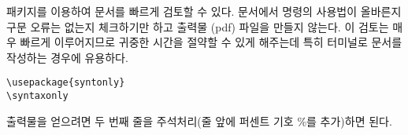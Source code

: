  패키지를 이용하여 문서를 빠르게 검토할 수 있다. 문서에서 명령의 사용법이 올바른지 
구문 오류는 없는지 체크하기만 하고 출력물 (pdf) 파일을 만들지 않는다.
이 검토는 매우 빠르게 이루어지므로 귀중한 시간을 절약할 수 있게 해주는데 특히 터미널로 문서를 작성하는 경우에 유용하다.

\begin{verbatim}
\usepackage{syntonly}
\syntaxonly
\end{verbatim}
출력물을 얻으려면 두 번째 줄을 주석처리(줄 앞에 퍼센트 기호 \%를 추가)하면 된다.


